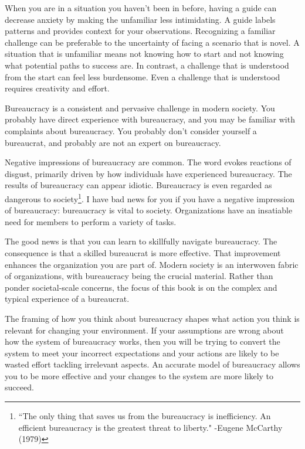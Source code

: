 
When you are in a situation you haven't been in before, having a guide can decrease anxiety by making the unfamiliar less intimidating. 
A guide labels patterns and provides context for your observations. 
Recognizing a familiar challenge can be preferable to the uncertainty of facing a scenario that is novel. A situation that is unfamiliar means not knowing how to start and not knowing what potential paths to success are. In contrast, a challenge that is understood from the start can feel less burdensome. Even a challenge that is understood requires creativity and effort.

Bureaucracy is a consistent and pervasive challenge in modern society. You probably have direct experience with bureaucracy, and you may be familiar with complaints about bureaucracy. You probably don't consider yourself a bureaucrat, and probably are not an expert on bureaucracy.


Negative impressions of bureaucracy are common. The word
evokes reactions of disgust, primarily driven by how individuals have experienced bureaucracy.
The results of bureaucracy can appear idiotic.
Bureaucracy is even regarded as dangerous to society\footnote{``The only thing that saves us from the bureaucracy is inefficiency. An efficient bureaucracy is the greatest threat to liberty." -Eugene McCarthy (1979)}.
I have bad news for you if you have a negative impression of bureaucracy: bureaucracy is vital to society. 
Organizations have an insatiable need for members to perform a variety of tasks.

The good news is that you can learn to skillfully navigate bureaucracy. The consequence is that a skilled bureaucrat is more effective. That improvement enhances the organization you are part of. Modern society is an interwoven fabric of organizations, with  bureaucracy being the crucial material.
Rather than ponder societal-scale concerns, the focus of this book is on the complex and typical experience of a bureaucrat. 


The framing of how you think about bureaucracy shapes what action you think is relevant for changing your environment. 
If your assumptions are wrong about how the system of bureaucracy works, then you will be trying to convert the system to meet your incorrect expectations and your actions are likely to be wasted effort tackling irrelevant aspects. 
An accurate model of bureaucracy allows you to be more effective and your changes to the system are more likely to succeed. 

